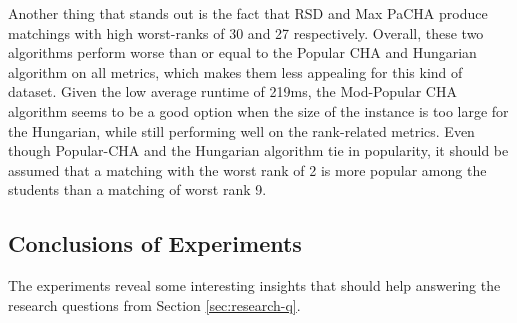 \begin{table}[h!]
  \centering
  \caption{Average results for large uniform dataset with complete preferences.}
  \label{tab:results-uniform-large-complete}
\end{table}

Another thing that stands out is the fact that RSD and Max PaCHA produce matchings with high worst-ranks of 30 and 27 respectively. Overall, these two algorithms perform worse than or equal to the Popular CHA and Hungarian algorithm on all metrics, which makes them less appealing for this kind of dataset. Given the low average runtime of 219ms, the Mod-Popular CHA algorithm seems to be a good option when the size of the instance is too large for the Hungarian, while still performing well on the rank-related metrics. Even though Popular-CHA and the Hungarian algorithm tie in popularity, it should be assumed that a matching with the worst rank of 2 is more popular among the students than a matching of worst rank 9. 

\subsection{Conclusions of Experiments}
The experiments reveal some interesting insights that should help answering the research questions from Section \ref{sec:research-q}.

